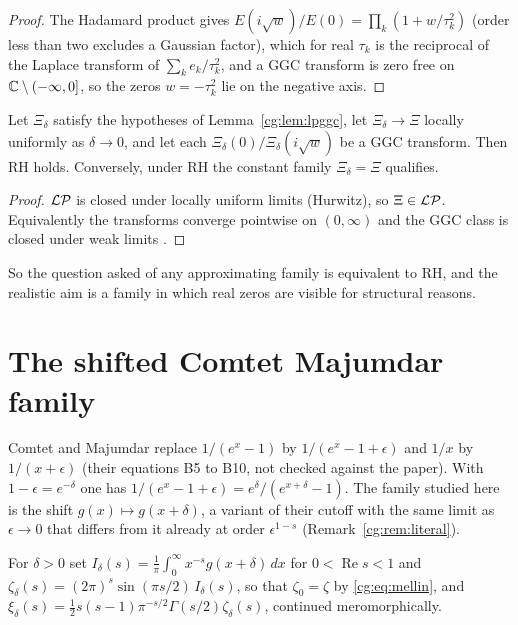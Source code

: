 \begin{proof}
The Hadamard product gives $E(i\sqrt w)/E(0)=\prod_k(1+w/\tau_k^2)$ (order less than two excludes a Gaussian factor), which for real $\tau_k$ is the reciprocal of the Laplace transform of $\sum_ke_k/\tau_k^2$, and a GGC transform is zero free on $\mathbb{C}\setminus(-\infty,0]$, so the zeros $w=-\tau_k^2$ lie on the negative axis.
\end{proof}

\begin{corollary}\label{cg:cor:closure}
Let $\Xi_\delta$ satisfy the hypotheses of Lemma~\ref{cg:lem:lpggc}, let $\Xi_\delta\to\Xi$ locally uniformly as $\delta\to0$, and let each $\Xi_\delta(0)/\Xi_\delta(i\sqrt w)$ be a GGC transform. Then RH holds. Conversely, under RH the constant family $\Xi_\delta=\Xi$ qualifies.
\end{corollary}

\begin{proof}
$\mathcal{L}\mathcal{P}$ is closed under locally uniform limits (Hurwitz), so $\Xi\in\mathcal{L}\mathcal{P}$. Equivalently the transforms converge pointwise on $(0,\infty)$ and the GGC class is closed under weak limits \cite{Bondesson}.
\end{proof}

So the question asked of any approximating family is equivalent to RH, and the realistic aim is a family in which real zeros are visible for structural reasons.

\section{The shifted Comtet Majumdar family}\label{cg:sec:cmfamily}

Comtet and Majumdar replace $1/(e^x-1)$ by $1/(e^x-1+\epsilon)$ and $1/x$ by $1/(x+\epsilon)$ (their equations B5 to B10, not checked against the paper). With $1-\epsilon=e^{-\delta}$ one has $1/(e^x-1+\epsilon)=e^{\delta}/(e^{x+\delta}-1)$. The family studied here is the shift $g(x)\mapsto g(x+\delta)$, a variant of their cutoff with the same limit as $\epsilon\to0$ that differs from it already at order $\epsilon^{1-s}$ (Remark~\ref{cg:rem:literal}).

\begin{definition}
For $\delta>0$ set $I_\delta(s)=\frac1\pi\int_0^\infty x^{-s}g(x+\delta)\,dx$ for $0<\operatorname{Re}s<1$ and $\zeta_\delta(s)=(2\pi)^s\sin(\pi s/2)\,I_\delta(s)$, so that $\zeta_0=\zeta$ by \eqref{cg:eq:mellin}, and $\xi_\delta(s)=\frac12s(s-1)\pi^{-s/2}\Gamma(s/2)\zeta_\delta(s)$, continued meromorphically.
\end{definition}

